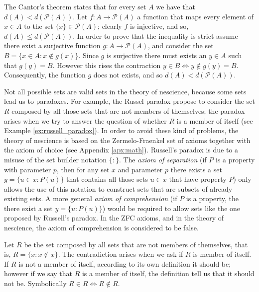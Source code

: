 \begin{example}
\label{cantor_theorem}
The Cantor's theorem states that for every set $A$ we have that $d(A) < d\left(\mathcal{P}(A)\right)$. Let $f: A \rightarrow \mathcal{P}(A)$ a function that maps every element of $x \in A$ to the set $\{x\} \in \mathcal{P}(A)$; clearly $f$ is injective, and so, $d(A) \leq d\left(\mathcal{P}(A)\right)$. In order to prove that the inequality is strict assume there exist a surjective function $g: A \rightarrow \mathcal{P}(A)$, and consider the set $B = \{ x \in A : x \notin g(x) \}$. Since $g$ is surjective there must exists an $y \in A$ such that $g(y) = B$. However this rises the contraction $y \in B \Leftrightarrow y \notin g(y) = B$. Consequently, the function $g$ does not exists, and so $d(A) < d\left(\mathcal{P}(A)\right)$.
\end{example}

Not all possible sets are valid sets in the theory of nescience, because some sets lead us to paradoxes. For example, the Russel paradox propose to consider the set $R$ composed by all those sets that are not members of themselves; the paradox arises when we try to answer the question of whether $R$ is a member of itself (see Example \ref{ex:russell_paradox}). In order to avoid these kind of problems, the theory of nescience is based on the Zermelo-Fraenkel set of axioms together with the axiom of choice (see Appendix \ref{apx:math}). Russell's paradox is due to a misuse of the set builder notation $\{ : \}$. The \emph{axiom of separation} (if $P$ is a property with parameter $p$, then for any set $x$ and parameter $p$ there exists a set $y=\{u \in x : P(u) \}$ that contains all those sets $u \in x$ that have property $P$) only allows the use of this notation to construct sets that are subsets of already existing sets. A more general \emph{axiom of comprehension} (if $P$ is a property, the there exist a set $y=\{u : P(u) \}$) would be required to allow sets like the one proposed by Russell's paradox. In the ZFC axioms, and in the theory of nescience, the axiom of comprehension is considered to be false.

\begin{example}
\label{ex:russell_paradox}
Let $R$ be the set composed by all sets that are not members of themselves, that is, $R = \{ x : x \notin x \}$. The contradiction arises when we ask if $R$ is member of itself. If $R$ is not a member of itself, according to its own definition it should be; however if we say that $R$ is a member of itself, the definition tell us that it should not be. Symbolically $R \in R \Leftrightarrow R \notin R$.
\end{example}


